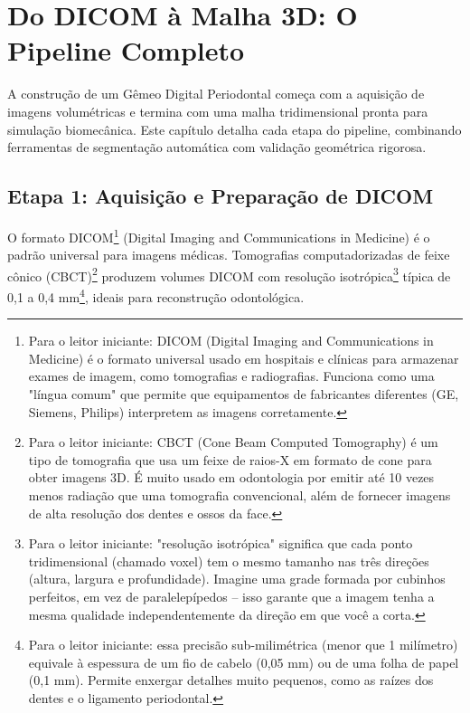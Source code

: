 
\section{Do DICOM à Malha 3D: O Pipeline Completo}

A construção de um Gêmeo Digital Periodontal começa com a aquisição de imagens volumétricas e termina com uma malha tridimensional pronta para simulação biomecânica. Este capítulo detalha cada etapa do pipeline, combinando ferramentas de segmentação automática com validação geométrica rigorosa.

\subsection{Etapa 1: Aquisição e Preparação de DICOM}

O formato DICOM\footnote{Para o leitor iniciante: DICOM (Digital Imaging and Communications in Medicine) é o formato universal usado em hospitais e clínicas para armazenar exames de imagem, como tomografias e radiografias. Funciona como uma "língua comum" que permite que equipamentos de fabricantes diferentes (GE, Siemens, Philips) interpretem as imagens corretamente.} (Digital Imaging and Communications in Medicine) é o padrão universal para imagens médicas. Tomografias computadorizadas de feixe cônico (CBCT)\footnote{Para o leitor iniciante: CBCT (Cone Beam Computed Tomography) é um tipo de tomografia que usa um feixe de raios-X em formato de cone para obter imagens 3D. É muito usado em odontologia por emitir até 10 vezes menos radiação que uma tomografia convencional, além de fornecer imagens de alta resolução dos dentes e ossos da face.} produzem volumes DICOM com resolução isotrópica\footnote{Para o leitor iniciante: "resolução isotrópica" significa que cada ponto tridimensional (chamado voxel) tem o mesmo tamanho nas três direções (altura, largura e profundidade). Imagine uma grade formada por cubinhos perfeitos, em vez de paralelepípedos -- isso garante que a imagem tenha a mesma qualidade independentemente da direção em que você a corta.} típica de 0,1 a 0,4 mm\footnote{Para o leitor iniciante: essa precisão sub-milimétrica (menor que 1 milímetro) equivale à espessura de um fio de cabelo (0,05 mm) ou de uma folha de papel (0,1 mm). Permite enxergar detalhes muito pequenos, como as raízes dos dentes e o ligamento periodontal.}, ideais para reconstrução odontológica.

